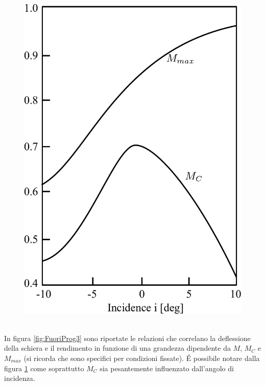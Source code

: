\begin{figure}[h!]
\begin{minipage}{.4\textwidth}
		\includegraphics[width=\linewidth]{fig/FuoriProg4.pdf}
		\label{fig:FuoriProg4}
	\end{minipage}
\end{figure}
\\In figura \ref{fig:FuoriProg3} sono riportate le relazioni che correlano la deflessione della schiera e il rendimento in funzione di una grandezza dipendente da $M$, $M_C$ e $M_{max}$ (si ricorda che sono specifici per condizioni fissate). \'E possibile notare dalla figura \ref{fig:FuoriProg4} come soprattutto $M_C$ sia pesantemente influenzato dall'angolo di incidenza.

